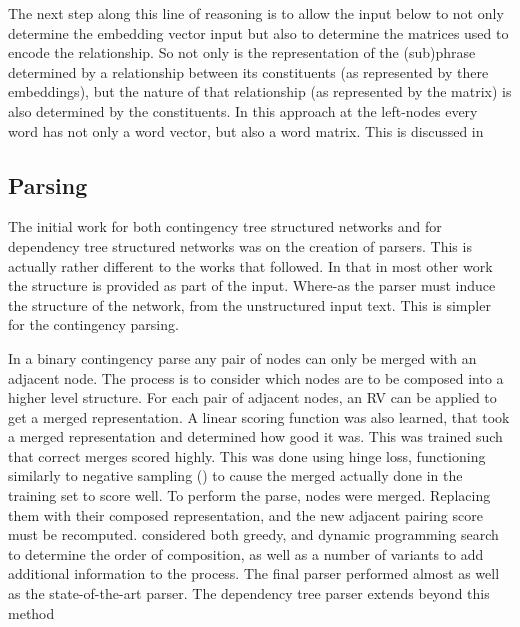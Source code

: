 \documentclass[12pt,parskip]{komatufte}
\begin{document}
The next step along this line of reasoning is to allow the input below to not only determine the embedding vector input but also to determine the matrices used to encode the relationship.
So not only is the representation of the (sub)phrase determined by a relationship between  its constituents (as represented by there embeddings),
but the nature of that relationship (as represented by the matrix) is also determined by the constituents.
In this approach at the left-nodes every word has not only a word vector, but also a word matrix.
This is discussed in 


\subsection{Parsing}
The initial work for both contingency tree structured networks  \parencite{socher2010PhraseEmbedding} and for dependency tree structured networks  was on the creation of parsers.
This is actually rather different to the works that followed.
In that in most other work the structure is provided as part of the input.
Where-as the parser must induce the structure of the network,
from the unstructured input text.
This is simpler for the contingency parsing.

In a binary contingency parse any pair of nodes can only be merged with an adjacent node.
The process is to consider which nodes are to be composed into a higher level structure.
For each pair of adjacent nodes, an RV can be applied to get a merged representation.
A linear scoring function was also learned, that took a merged representation and determined how good it was.
This was trained such that correct merges scored highly.
This was done using hinge loss, functioning similarly to negative sampling () to cause the merged actually done in the training set to score well.
To perform the parse, nodes were merged.
Replacing them with their composed representation, and the new adjacent pairing score must be recomputed.
\textcite{socher2010PhraseEmbedding} considered both greedy, and dynamic programming search to determine the order of composition, as well as a number of variants to add additional information to the process.
The final parser performed almost as well as the state-of-the-art parser.
The dependency tree parser extends beyond this method
\end{document}
